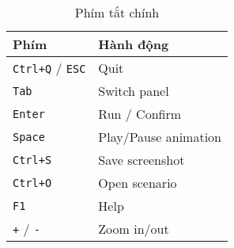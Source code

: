 \begin{table}[H]
\centering
\caption{Phím tắt chính}
\begin{tabular}{ll}
\toprule
\textbf{Phím} & \textbf{Hành động} \\
\midrule
\texttt{Ctrl+Q} / \texttt{ESC} & Quit \\
\texttt{Tab} & Switch panel \\
\texttt{Enter} & Run / Confirm \\
\texttt{Space} & Play/Pause animation \\
\texttt{Ctrl+S} & Save screenshot \\
\texttt{Ctrl+O} & Open scenario \\
\texttt{F1} & Help \\
\texttt{+} / \texttt{-} & Zoom in/out \\
\bottomrule
\end{tabular}
\end{table}

\clearpage
